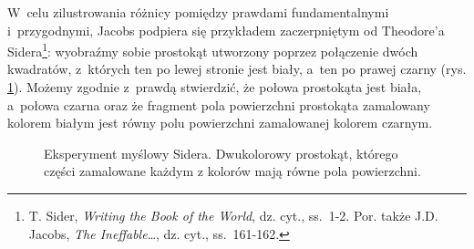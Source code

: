 W~celu zilustrowania różnicy pomiędzy prawdami fundamentalnymi i~przygodnymi, Jacobs podpiera się przykładem zaczerpniętym od Theodore'a Sidera\footnote{T. Sider, \textit{Writing the Book of the World}, dz. cyt., ss.~1-2. Por. także J.D. Jacobs, \textit{The Ineffable}\ldots, dz. cyt., ss.~161-162.}: wyobraźmy sobie prostokąt utworzony poprzez połączenie dwóch kwadratów, z~których ten po lewej stronie jest biały, a~ten po prawej czarny (rys. \ref{sil-jac-siderpic}). Możemy zgodnie z~prawdą stwierdzić, że połowa prostokąta jest biała, a~połowa czarna oraz że fragment pola powierzchni prostokąta zamalowany kolorem białym jest równy polu powierzchni zamalowanej kolorem czarnym.
\begin{figure}[H]
\begin{center}


\caption[Eksperyment myślowy Sidera]{Eksperyment myślowy Sidera. Dwukolorowy prostokąt, którego części zamalowane każdym z kolorów mają równe pola powierzchni.}\label{sil-jac-siderpic}
\end{center}
\end{figure}

